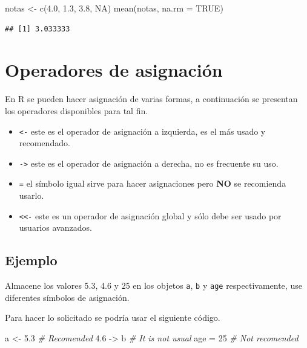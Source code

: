 \documentclass[
]{book}
\newenvironment{Shaded}{\begin{snugshade}}{\end{snugshade}}
\newcommand{\AttributeTok}[1]{\textcolor[rgb]{0.77,0.63,0.00}{#1}}
\newcommand{\CommentTok}[1]{\textcolor[rgb]{0.56,0.35,0.01}{\textit{#1}}}
\newcommand{\ConstantTok}[1]{\textcolor[rgb]{0.00,0.00,0.00}{#1}}
\newcommand{\DecValTok}[1]{\textcolor[rgb]{0.00,0.00,0.81}{#1}}
\newcommand{\FloatTok}[1]{\textcolor[rgb]{0.00,0.00,0.81}{#1}}
\newcommand{\FunctionTok}[1]{\textcolor[rgb]{0.00,0.00,0.00}{#1}}
\newcommand{\NormalTok}[1]{#1}
\newcommand{\OtherTok}[1]{\textcolor[rgb]{0.56,0.35,0.01}{#1}}
\providecommand{\tightlist}{%
  \setlength{\itemsep}{0pt}\setlength{\parskip}{0pt}}
\begin{document}
\begin{Shaded}
\begin{Highlighting}[]
\NormalTok{notas }\OtherTok{\textless{}{-}} \FunctionTok{c}\NormalTok{(}\FloatTok{4.0}\NormalTok{, }\FloatTok{1.3}\NormalTok{, }\FloatTok{3.8}\NormalTok{, }\ConstantTok{NA}\NormalTok{) }
\FunctionTok{mean}\NormalTok{(notas, }\AttributeTok{na.rm =} \ConstantTok{TRUE}\NormalTok{)}
\end{Highlighting}
\end{Shaded}

\begin{verbatim}
## [1] 3.033333
\end{verbatim}

\hypertarget{operadores-de-asignaciuxf3n}{%
\section{Operadores de asignación}\label{operadores-de-asignaciuxf3n}}

En R se pueden hacer asignación de varias formas, a continuación se presentan los operadores disponibles para tal fin.

\begin{itemize}
\tightlist
\item
  \texttt{\textless{}-} este es el operador de asignación a izquierda, es el más usado y recomendado.
\item
  \texttt{-\textgreater{}} este es el operador de asignación a derecha, no es frecuente su uso.
\item
  \texttt{=} el símbolo igual sirve para hacer asignaciones pero \textbf{NO} se recomienda usarlo.
\item
  \texttt{\textless{}\textless{}-} este es un operador de asignación global y sólo debe ser usado por usuarios avanzados.
\end{itemize}

\hypertarget{ejemplo-5}{%
\subsection*{Ejemplo}\label{ejemplo-5}}

Almacene los valores 5.3, 4.6 y 25 en los objetos \texttt{a}, \texttt{b} y \texttt{age} respectivamente, use diferentes símbolos de asignación.

Para hacer lo solicitado se podría usar el siguiente código.

\begin{Shaded}
\begin{Highlighting}[]
\NormalTok{a }\OtherTok{\textless{}{-}} \FloatTok{5.3} \CommentTok{\# Recomended}
\FloatTok{4.6} \OtherTok{{-}\textgreater{}}\NormalTok{ b }\CommentTok{\# It is not usual}
\NormalTok{age }\OtherTok{=} \DecValTok{25} \CommentTok{\# Not recomended}
\end{Highlighting}
\end{Shaded}
\end{document}
